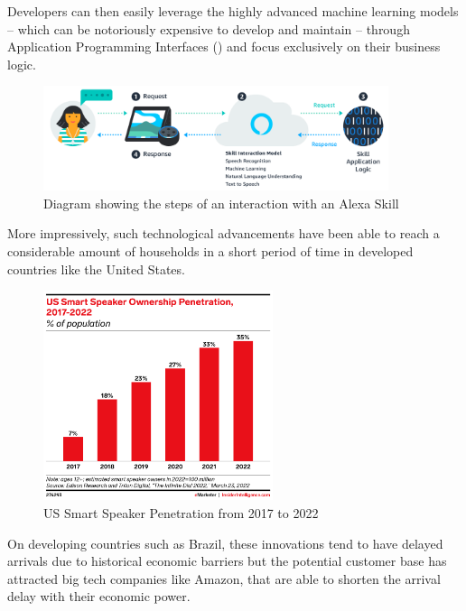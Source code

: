 \documentclass[openright]{normas-utf-tex} %
\begin{document}
Developers can then easily leverage the highly advanced machine learning models
-- which can be notoriously expensive to develop and maintain \cite{Phdata2021}
-- through Application Programming Interfaces () and focus exclusively on their business logic.

\begin{figure}[htb!]
	\centering
	\includegraphics[width=0.9\textwidth]{./images/skills.png} %
	\caption[Diagram showing the steps of an interaction with an Alexa Skill]{Diagram showing the steps of an interaction with an Alexa Skill}
	\label{fig:alexaskill}
\end{figure}

More impressively, such technological advancements have been able to reach a
considerable amount of households in a short period of time in developed
countries like the United States. 

\begin{figure}[H]
	\centering
	\includegraphics[width=0.6\textwidth]{./images/smartspeaker.png} %
	\caption[US Smart Speaker Penetration from 2017 to 2022]{US Smart Speaker Penetration from 2017 to 2022}
	\label{fig:smartspeaker}
\end{figure}

On developing countries such as Brazil, these innovations tend to
have delayed arrivals due to historical economic barriers but the potential
customer base has attracted big tech companies like Amazon, that are able
to shorten the arrival delay with their economic power.
\end{document}
